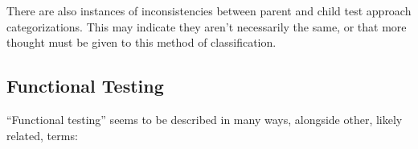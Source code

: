 There are also instances of inconsistencies between parent and child
test approach categorizations. This may indicate they aren't necessarily the
same, or that more thought must be given to this method of classification.

\subsection{Functional Testing}
\label{func-test-discrep}

``Functional testing'' seems to be described in many
ways, alongside other, likely related, terms:


